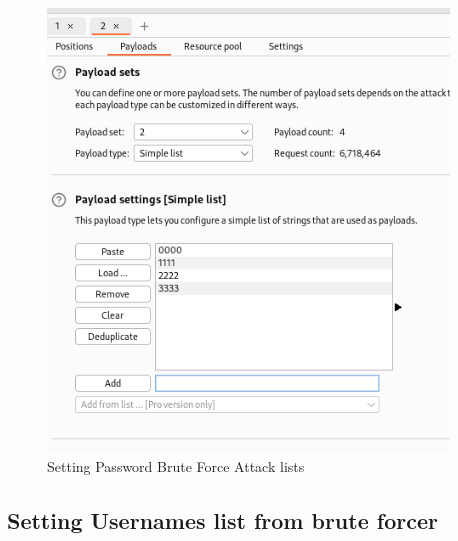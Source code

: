 \documentclass[11pt]{article}
\begin{document}
\begin{figure}[H]
    \centering
    \includegraphics[width=0.95\textwidth]{burpsuite (7).png}
    \caption{Setting Password Brute Force Attack lists}
    \label{fig:1}
\end{figure}
\subsection{Setting Usernames list from brute forcer}


\end{document}
